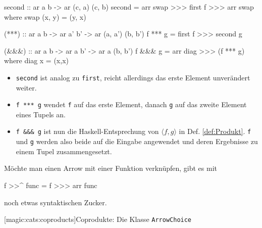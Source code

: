 \documentclass[a4paper, bibgerm]{book}
\newcommand\icode[1]{\lstinline?#1?}
\newcommand\lsubsection{}
\newcommand{\dref}[1]{Def. \ref{def:#1}}
\begin{document}
\begin{code}
  second :: ar a b -> ar (c, a) (c, b)
  second = arr swap >>> first f >>> arr swap
    where swap (x, y) = (y, x)

  (***) :: ar a b -> ar a' b' -> ar (a, a') (b, b')
  f *** g = first f >>> second g

  (&&&) :: ar a b -> ar a b' -> ar a (b, b')
  f &&& g = arr diag >>> (f *** g)
    where diag x = (x,x)
\end{code} %

\begin{itemize}
\item \icode{second} ist analog zu \icode{first}, reicht allerdings das erste
Element unverändert weiter.
\item \icode{f *** g} wendet \icode{f} auf das
erste Element, danach \icode{g} auf das zweite Element eines Tupels
an.
\item \icode{f &&& g} ist nun die Haskell-Entsprechung von $\langle f,g
\rangle$ in \dref{Produkt}. \icode{f} und \icode{g} werden also beide
auf die Eingabe angewendet und deren Ergebnisse zu einem Tupel
zusammengesetzt.
\end{itemize}

Möchte man einen Arrow mit einer Funktion verknüpfen, gibt es mit
\begin{code}
f >>^ func = f >>> arr func
\end{code}%
noch etwas syntaktischen Zucker.

\lsubsection[magic:cats:coproducts]{Coprodukte: Die Klasse \texttt{ArrowChoice}}
\end{document}
